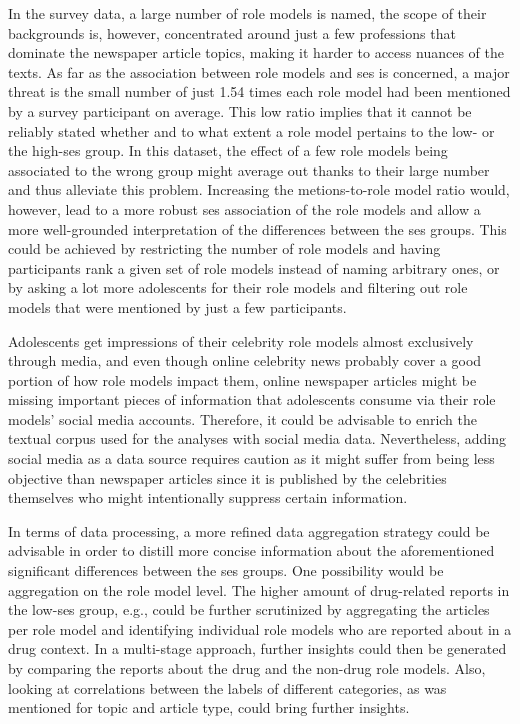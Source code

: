 In the survey data, a large number of role models is named, the scope of their backgrounds is, however, concentrated around just a few professions that dominate the newspaper article topics, making it harder to access nuances of the texts. As far as the association between role models and \gls{ses} is concerned, a major threat is the small number of just \SI{1.54}{} times each role model had been mentioned by a survey participant on average. This low ratio implies that it cannot be reliably stated whether and to what extent a role model pertains to the low- or the high-\gls{ses} group. In this dataset, the effect of a few role models being associated to the wrong group might average out thanks to their large number and thus alleviate this problem. Increasing the metions-to-role model ratio would, however, lead to a more robust \gls{ses} association of the role models and allow a more well-grounded interpretation of the differences between the \gls{ses} groups. This could be achieved by restricting the number of role models and having participants rank a given set of role models instead of naming arbitrary ones, or by asking a lot more adolescents for their role models and filtering out role models that were mentioned by just a few participants.

Adolescents get impressions of their celebrity role models almost exclusively through media, and even though online celebrity news probably cover a good portion of how role models impact them, online newspaper articles might be missing important pieces of information that adolescents consume via their role models' social media accounts. Therefore, it could be advisable to enrich the textual corpus used for the analyses with social media data. Nevertheless, adding social media as a data source requires caution as it might suffer from being less objective than newspaper articles since it is published by the celebrities themselves who might intentionally suppress certain information.

In terms of data processing, a more refined data aggregation strategy could be advisable in order to distill more concise information about the aforementioned significant differences between the \gls{ses} groups. One possibility would be aggregation on the role model level. The higher amount of drug-related reports in the low-\gls{ses} group, e.g., could be further scrutinized by aggregating the articles per role model and identifying individual role models who are reported about in a drug context. In a multi-stage approach, further insights could then be generated by comparing the reports about the drug and the non-drug role models. Also, looking at correlations between the labels of different categories, as was mentioned for topic and article type, could bring further insights.

